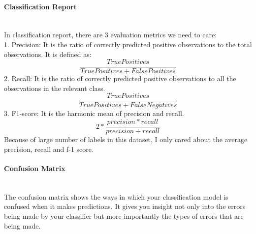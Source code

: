 \documentclass[runningheads]{llncs}
\begin{document}
\paragraph{\large\bf Classification Report}\hspace*{\fill} \\
In classification report, there are 3 evaluation metrics we need to care: \\
1. Precision: It is the ratio of correctly predicted positive observations to the
total observations. It is defined as:
\begin{equation}
    \frac{TruePositives}{TruePositives + FalsePositives}
\end{equation}
2. Recall: It is the ratio of correctly predicted positive observations to all the
observations in the relevant class.
\begin{equation}
    \frac{TruePositives}{TruePositives + FalseNegatives}
\end{equation}
3. F1-score: It is the harmonic mean of precision and recall.\cite{cnn_project}
\begin{equation}
    2 * \frac{precision * recall}{precision + recall}
\end{equation}
Because of large number of labels in this dataset, I only cared about the average precision, recall and f-1 score.
\paragraph{\large\bf Confusion Matrix}\hspace*{\fill} \\
The confusion matrix shows the ways in which your classification model is confused when it makes predictions. It gives you insight not only into the errors being made by your classifier but more importantly the types of errors that are being made.
\end{document}
